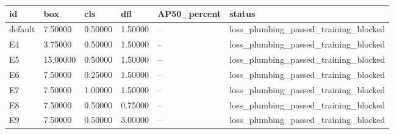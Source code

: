 \begin{tabular}{llllll}
\hline
id & box & cls & dfl & AP50\_percent & status \\
\hline
default & 7.50000 & 0.50000 & 1.50000 & -- & loss\_plumbing\_passed\_training\_blocked \\
E4 & 3.75000 & 0.50000 & 1.50000 & -- & loss\_plumbing\_passed\_training\_blocked \\
E5 & 15.00000 & 0.50000 & 1.50000 & -- & loss\_plumbing\_passed\_training\_blocked \\
E6 & 7.50000 & 0.25000 & 1.50000 & -- & loss\_plumbing\_passed\_training\_blocked \\
E7 & 7.50000 & 1.00000 & 1.50000 & -- & loss\_plumbing\_passed\_training\_blocked \\
E8 & 7.50000 & 0.50000 & 0.75000 & -- & loss\_plumbing\_passed\_training\_blocked \\
E9 & 7.50000 & 0.50000 & 3.00000 & -- & loss\_plumbing\_passed\_training\_blocked \\
\hline
\end{tabular}
